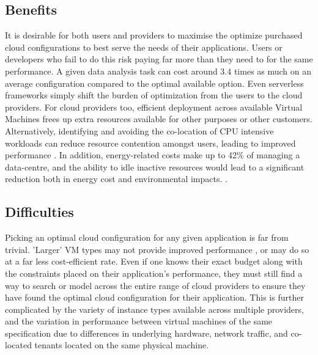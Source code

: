 \documentclass{report}
\begin{document}
\subsection{Benefits}
It is desirable for both users and providers to maximise the optimize purchased cloud configurations to best serve the needs of their applications. Users or developers who fail to do this risk paying far more than they need to for the same performance. A given data analysis task can cost around 3.4 times as much on an average configuration compared to the optimal available option\cite{Alipourfard2017}. Even serverless frameworks simply shift the burden of optimization from the users to the cloud providers. For cloud providers too, efficient deployment across available Virtual Machines frees up extra resources available for other purposes or other customers. Alternatively, identifying and avoiding the co-location of CPU intensive workloads can reduce resource contention amongst users, leading to improved performance \cite{Pu2010}. In addition, energy-related costs make up to 42\% of managing a data-centre, and the ability to idle inactive resources would lead to a significant reduction both in energy cost and environmental impacts. \cite{Berl2010, Gkatzikis2013}. 

\subsection{Difficulties}
Picking an optimal cloud configuration for any given application is far from trivial. 'Larger' VM types may not provide improved performance \cite{Yadwadkar2017}, or may do so at a far less cost-efficient rate. Even if one knows their exact budget along with the constraints placed on their application's performance, they must still find a way to search or model across the entire range of cloud providers to ensure they have found the optimal cloud configuration for their application. This is further complicated by the variety of instance types available across multiple providers, and the variation in performance between virtual machines of the same specification due to differences in underlying hardware, network traffic, and co-located tenants located on the same physical machine.
\end{document}
